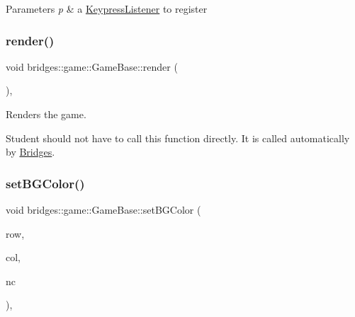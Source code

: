 \begin{DoxyParams}{Parameters}
{\em p} & a \hyperlink{classbridges_1_1game_1_1_keypress_listener}{Keypress\+Listener} to register \\
\hline
\end{DoxyParams}
\mbox{\label{classbridges_1_1game_1_1_game_base_ac042479b1d1cf87b8ea7c8884d5326b6}} 
\subsubsection{\texorpdfstring{render()}{render()}}
{\footnotesize\ttfamily void bridges\+::game\+::\+Game\+Base\+::render (\begin{DoxyParamCaption}{ }\end{DoxyParamCaption})\hspace{0.3cm}{\ttfamily [inline]}, {\ttfamily [protected]}}



Renders the game. 

Student should not have to call this function directly. It is called automatically by \hyperlink{classbridges_1_1_bridges}{Bridges}. \mbox{\label{classbridges_1_1game_1_1_game_base_ab667bbca1c81e5fb3aa8d81d70fe8cd2}} 
\subsubsection{\texorpdfstring{set\+B\+G\+Color()}{setBGColor()}}
{\footnotesize\ttfamily void bridges\+::game\+::\+Game\+Base\+::set\+B\+G\+Color (\begin{DoxyParamCaption}\item[{int}]{row,  }\item[{int}]{col,  }\item[{\hyperlink{namespacebridges_1_1game_afaa832a4322b25b6a4ebfba832f10f26}{Named\+Color}}]{nc }\end{DoxyParamCaption})\hspace{0.3cm}{\ttfamily [inline]}, {\ttfamily [protected]}}



